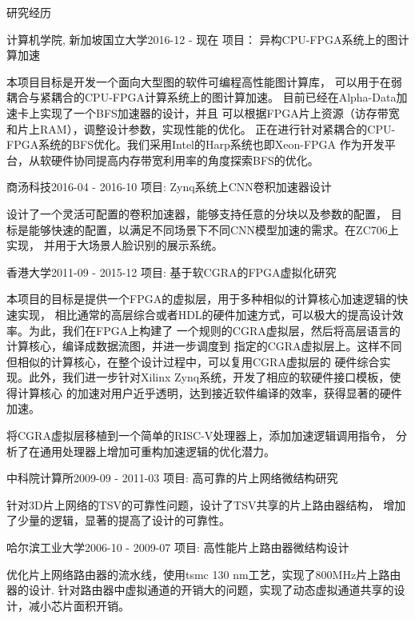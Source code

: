 \documentclass{resume} %
\begin{document}
\begin{rSection}{研究经历}
\begin{rSubsection}{计算机学院, 新加坡国立大学}{2016-12 - 现在}{
        项目： 异构CPU-FPGA系统上的图计算加速}{}
\item 本项目目标是开发一个面向大型图的软件可编程高性能图计算库，
    可以用于在弱耦合与紧耦合的CPU-FPGA计算系统上的图计算加速。
    目前已经在Alpha-Data加速卡上实现了一个BFS加速器的设计，并且
    可以根据FPGA片上资源（访存带宽和片上RAM），调整设计参数，实现性能的优化。
    正在进行针对紧耦合的CPU-FPGA系统的BFS优化。我们采用Intel的Harp系统也即Xeon-FPGA
    作为开发平台，从软硬件协同提高内存带宽利用率的角度探索BFS的优化。
\end{rSubsection}

\begin{rSubsection}{商汤科技}{2016-04 - 2016-10}{
        项目: Zynq系统上CNN卷积加速器设计}{}
\item 设计了一个灵活可配置的卷积加速器，能够支持任意的分块以及参数的配置，
    目标是能够快速的配置，以满足不同场景下不同CNN模型加速的需求。在ZC706上实现，
    并用于大场景人脸识别的展示系统。
\end{rSubsection}

\begin{rSubsection}{香港大学}{2011-09 - 2015-12}{
        项目: 基于软CGRA的FPGA虚拟化研究}{}
\item 本项目的目标是提供一个FPGA的虚拟层，用于多种相似的计算核心加速逻辑的快速实现，
    相比通常的高层综合或者HDL的硬件加速方式，可以极大的提高设计效率。为此，我们在FPGA上构建了
    一个规则的CGRA虚拟层，然后将高层语言的计算核心，编译成数据流图，并进一步调度到
    指定的CGRA虚拟层上。这样不同但相似的计算核心，在整个设计过程中，可以复用CGRA虚拟层的
    硬件综合实现。此外，我们进一步针对Xilinx Zynq系统，开发了相应的软硬件接口模板，使得计算核心
    的加速对用户近乎透明，达到接近软件编译的效率，获得显著的硬件加速。
\\
\item 将CGRA虚拟层移植到一个简单的RISC-V处理器上，添加加速逻辑调用指令，
    分析了在通用处理器上增加可重构加速逻辑的优化潜力。 
\end{rSubsection}


\begin{rSubsection}{中科院计算所}{2009-09 - 2011-03}{
        项目: 高可靠的片上网络微结构研究}{}
\item 针对3D片上网络的TSV的可靠性问题，设计了TSV共享的片上路由器结构，
    增加了少量的逻辑，显著的提高了设计的可靠性。
\end{rSubsection}


\begin{rSubsection}{哈尔滨工业大学}{2006-10 - 2009-07}{
       项目: 高性能片上路由器微结构设计}{}
\item 优化片上网络路由器的流水线，使用tsmc 130 nm工艺，实现了800MHz片上路由器的设计.
    针对路由器中虚拟通道的开销大的问题，实现了动态虚拟通道共享的设计，减小芯片面积开销。
\end{rSubsection}

\end{rSection}
\end{document}
